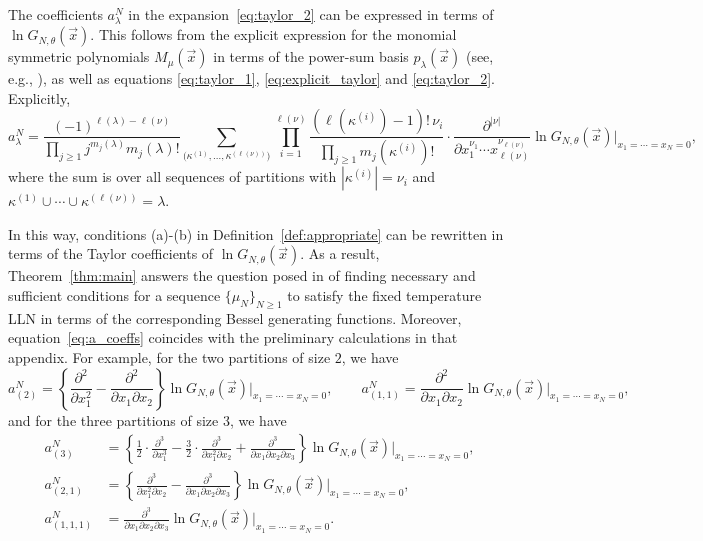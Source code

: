\documentclass[11pt]{article}
\theoremstyle{plain}
\newcommand{\setzeroes}{x_1=\cdots=x_N=0}
\newcommand{\la}{\lambda}
\newcommand{\vecx}{\vec{x}}
\begin{document}
The coefficients $a_\la^N$ in the expansion~\eqref{eq:taylor_2} can be expressed in terms of $\ln{G_{N,\theta}(\vecx)}$.
This follows from the explicit expression for the monomial symmetric polynomials $M_\mu(\vecx)$ in terms of the power-sum basis $p_\la(\vecx)$ (see, e.g., \cite[Prop.~2.13]{Z}), as well as equations \eqref{eq:taylor_1}, \eqref{eq:explicit_taylor} and \eqref{eq:taylor_2}.
Explicitly,
\begin{equation}\label{eq:a_coeffs}
a_\la^N = \frac{(-1)^{\ell(\la)-\ell(\nu)}}{\prod_{j\ge 1}{j^{m_j(\la)}m_j(\la)!}} \sum_{\big( \kappa^{(1)},\dots,\kappa^{(\ell(\nu))} \big)} \prod_{i=1}^{\ell(\nu)} \frac{(\ell(\kappa^{(i)})-1)!\,\nu_i}{\prod_{j\ge 1}{m_j(\kappa^{(i)})!}}\cdot
\frac{\partial^{|\nu|}}{\partial x_1^{\nu_1}\cdots x_{\ell(\nu)}^{\nu_{\ell(\nu)}}}\ln{G_{N,\theta}(\vecx)}\bigg|_{\setzeroes},
\end{equation}
where the sum is over all sequences of partitions with $|\kappa^{(i)}|=\nu_i$ and $\kappa^{(1)}\cup\cdots\cup\kappa^{(\ell(\nu))}=\la$.

In this way, conditions (a)-(b) in Definition~\ref{def:appropriate} can be rewritten in terms of the Taylor coefficients of $\ln{G_{N,\theta}(\vecx)}$.
As a result, Theorem~\ref{thm:main} answers the question posed in \cite{BCG} of finding necessary and sufficient conditions for a sequence $\{\mu_N\}_{N\ge 1}$ to satisfy the fixed temperature LLN in terms of the corresponding Bessel generating functions.
Moreover, equation~\eqref{eq:a_coeffs} coincides with the preliminary calculations in that appendix.
For example, for the two partitions of size $2$, we have
\[
a_{(2)}^N = \left\{ \frac{\partial^2}{\partial x_1^2} - \frac{\partial^2}{\partial x_1\partial x_2} \right\}{\ln{G_{N,\theta}(\vecx)}}\bigg|_{\setzeroes}, \qquad
a_{(1,1)}^N = \frac{\partial^2}{\partial x_1\partial x_2}{\ln{G_{N,\theta}(\vecx)}}\bigg|_{\setzeroes},
\]
and for the three partitions of size $3$, we have
\begin{align*}
a_{(3)}^N &= \left\{ \frac{1}{2}\cdot\frac{\partial^3}{\partial x_1^3} - \frac{3}{2}\cdot\frac{\partial^3}{\partial x_1^2\partial x_2} + \frac{\partial^3}{\partial x_1\partial x_2\partial x_3} \right\}{\ln{G_{N,\theta}(\vecx)}}\bigg|_{\setzeroes},\\
a_{(2,1)}^N &= \left\{ \frac{\partial^3}{\partial x_1^2\partial x_2} - \frac{\partial^3}{\partial x_1\partial x_2\partial x_3} \right\}{\ln{G_{N,\theta}(\vecx)}}\bigg|_{\setzeroes},\\
a_{(1,1,1)}^N &= \frac{\partial^3}{\partial x_1\partial x_2\partial x_3} {\ln{G_{N,\theta}(\vecx)}}\bigg|_{\setzeroes}.
\end{align*}
\end{document}
